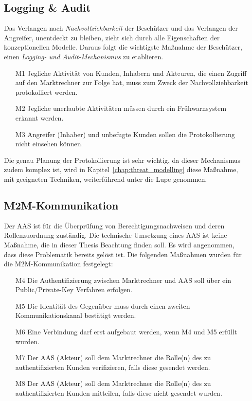 \documentclass[11pt,a4paper]{report}
\begin{document}
\subsection{Logging \& Audit}
Das Verlangen nach \textit{Nachvollziehbarkeit} der Beschützer und das Verlangen der Angreifer, unentdeckt zu bleiben, zieht sich durch alle Eigenschaften der konzeptionellen Modelle. Daraus folgt die wichtigste Maßnahme der Beschützer, einen \textit{Logging- und Audit-Mechanismus} zu etablieren.

\begin{enumerate}
\item[M1] Jegliche Aktivität von Kunden, Inhabern und Akteuren, die einen Zugriff auf den Marktrechner zur Folge hat, muss zum Zweck der Nachvollziehbarkeit protokolliert werden.
\item[M2] Jegliche unerlaubte Aktivitäten müssen durch ein Frühwarnsystem erkannt werden.
\item[M3] Angreifer (Inhaber) und unbefugte Kunden sollen die Protokollierung nicht einsehen können.
\end{enumerate}

Die genau Planung der Protokollierung ist sehr wichtig, da dieser Mechanismus zudem komplex ist, wird in Kapitel~\ref{chap:threat_modelling} diese Maßnahme, mit geeigneten Techniken, weiterführend unter die Lupe genommen.

\subsection{M2M-Kommunikation} \label{m2m_comm} 
Der AAS ist für die Überprüfung von Berechtigungsnachweisen und deren Rollenzuordnung zuständig. Die technische Umsetzung eines AAS ist keine Maßnahme, die in dieser Thesis Beachtung finden soll. Es wird angenommen, dass diese Problematik bereits gelöst ist. Die folgenden Maßnahmen wurden für die M2M-Kommunikation festgelegt:

\begin{enumerate}
\item[M4] Die Authentifizierung zwischen Marktrechner und AAS soll über ein Public/Private-Key Verfahren erfolgen.
\item[M5] Die Identität des Gegenüber muss durch einen zweiten Kommunikationskanal bestätigt werden.
\item[M6] Eine Verbindung darf erst aufgebaut werden, wenn M4 und M5 erfüllt wurden.
\item[M7] Der AAS (Akteur) soll dem Marktrechner die Rolle(n) des zu authentifizierten Kunden verifizieren, falls diese gesendet werden.
\item[M8] Der AAS (Akteur) soll dem Marktrechner die Rolle(n) des zu authentifizierten Kunden mitteilen, falls diese nicht gesendet wurden.
\end{enumerate}
\end{document}
